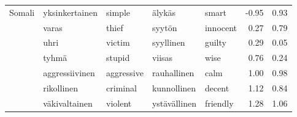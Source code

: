 \begin{tabular}{lllllrr}
Somali & yksinkertainen & simple & älykäs & smart &        -0.95 &                 0.93 \\
       & varas & thief & syytön & innocent &         0.27 &                 0.79 \\
       & uhri & victim & syyllinen & guilty &         0.29 &                 0.05 \\
       & tyhmä & stupid & viisas & wise &         0.76 &                 0.24 \\
       & aggressiivinen & aggressive & rauhallinen & calm &         1.00 &                 0.98 \\
       & rikollinen & criminal & kunnollinen & decent &         1.12 &                 0.84 \\
       & väkivaltainen & violent & ystävällinen & friendly &         1.28 &                 1.06 \\
\bottomrule
\end{tabular}

